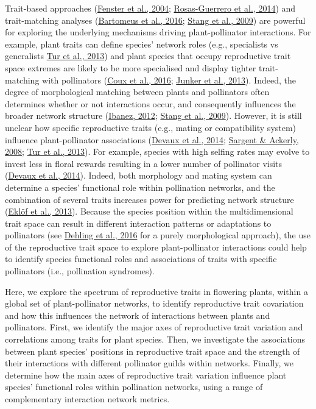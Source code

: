 \documentclass[
  12pt,
  a4paper,
]{article}
\begin{document}
Trait-based approaches (\protect\hyperlink{ref-fenster2004}{Fenster et al., 2004}; \protect\hyperlink{ref-rosas2014}{Rosas-Guerrero et al., 2014}) and trait-matching analyses (\protect\hyperlink{ref-bartomeus2016}{Bartomeus et al., 2016}; \protect\hyperlink{ref-stang2009}{Stang et al., 2009}) are powerful for exploring the underlying mechanisms driving plant-pollinator interactions. For example, plant traits can define species' network roles (e.g., specialists vs generalists \protect\hyperlink{ref-tur2013}{Tur et al., 2013}) and plant species that occupy reproductive trait space extremes are likely to be more specialised and display tighter trait-matching with pollinators (\protect\hyperlink{ref-coux2016}{Coux et al., 2016}; \protect\hyperlink{ref-junker2013}{Junker et al., 2013}). Indeed, the degree of morphological matching between plants and pollinators often determines whether or not interactions occur, and consequently influences the broader network structure (\protect\hyperlink{ref-ibanez2012}{Ibanez, 2012}; \protect\hyperlink{ref-stang2009}{Stang et al., 2009}). However, it is still unclear how specific reproductive traits (e.g., mating or compatibility system) influence plant-pollinator associations (\protect\hyperlink{ref-devaux2014}{Devaux et al., 2014}; \protect\hyperlink{ref-sargent2008}{Sargent \& Ackerly, 2008}; \protect\hyperlink{ref-tur2013}{Tur et al., 2013}). For example, species with high selfing rates may evolve to invest less in floral rewards resulting in a lower number of pollinator visits (\protect\hyperlink{ref-devaux2014}{Devaux et al., 2014}). Indeed, both morphology and mating system can determine a species' functional role within pollination networks, and the combination of several traits increases power for predicting network structure (\protect\hyperlink{ref-eklof2013}{Eklöf et al., 2013}). Because the species position within the multidimensional trait space can result in different interaction patterns or adaptations to pollinators (see \protect\hyperlink{ref-dehling2016}{Dehling et al., 2016} for a purely morphological approach), the use of the reproductive trait space to explore plant-pollinator interactions could help to identify species functional roles and associations of traits with specific pollinators (i.e., pollination syndromes).

Here, we explore the spectrum of reproductive traits in flowering plants, within a global set of plant-pollinator networks, to identify reproductive trait covariation and how this influences the network of interactions between plants and pollinators. First, we identify the major axes of reproductive trait variation and correlations among traits for plant species. Then, we investigate the associations between plant species' positions in reproductive trait space and the strength of their interactions with different pollinator guilds within networks. Finally, we determine how the main axes of reproductive trait variation influence plant species' functional roles within pollination networks, using a range of complementary interaction network metrics.
\end{document}
